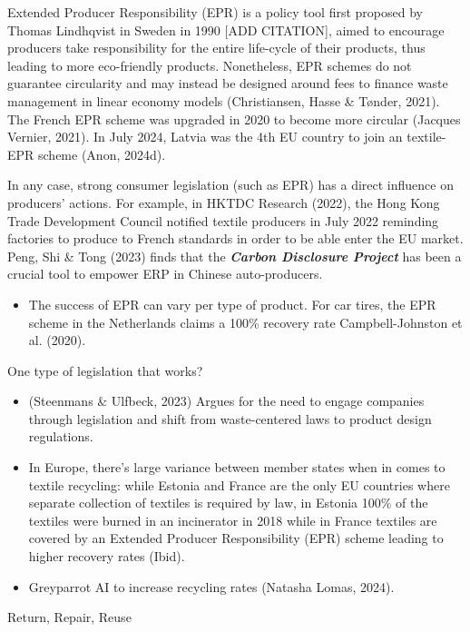 \documentclass[
  letterpaper,
  DIV=11,
  numbers=noendperiod]{scrartcl}
\providecommand{\tightlist}{%
  \setlength{\itemsep}{0pt}\setlength{\parskip}{0pt}}\usepackage{longtable,booktabs,array}
\begin{document}
Extended Producer Responsibility (EPR) is a policy tool first proposed
by Thomas Lindhqvist in Sweden in 1990 {[}ADD CITATION{]}, aimed to
encourage producers take responsibility for the entire life-cycle of
their products, thus leading to more eco-friendly products. Nonetheless,
EPR schemes do not guarantee circularity and may instead be designed
around fees to finance waste management in linear economy models
(Christiansen, Hasse \& Tønder, 2021). The French EPR scheme was
upgraded in 2020 to become more circular (Jacques Vernier, 2021). In
July 2024, Latvia was the 4th EU country to join an textile-EPR scheme
(Anon, 2024d).

In any case, strong consumer legislation (such as EPR) has a direct
influence on producers' actions. For example, in HKTDC Research (2022),
the Hong Kong Trade Development Council notified textile producers in
July 2022 reminding factories to produce to French standards in order to
be able enter the EU market. Peng, Shi \& Tong (2023) finds that the
\textbf{\emph{Carbon Disclosure Project}} has been a crucial tool to
empower ERP in Chinese auto-producers.

\begin{itemize}
\tightlist
\item
  The success of EPR can vary per type of product. For car tires, the
  EPR scheme in the Netherlands claims a 100\% recovery rate
  Campbell-Johnston et al. (2020).
\end{itemize}

One type of legislation that works?

\begin{itemize}
\item
  (Steenmans \& Ulfbeck, 2023) Argues for the need to engage companies
  through legislation and shift from waste-centered laws to product
  design regulations.
\item
  In Europe, there's large variance between member states when in comes
  to textile recycling: while Estonia and France are the only EU
  countries where separate collection of textiles is required by law, in
  Estonia 100\% of the textiles were burned in an incinerator in 2018
  while in France textiles are covered by an Extended Producer
  Responsibility (EPR) scheme leading to higher recovery rates (Ibid).
\item
  Greyparrot AI to increase recycling rates (Natasha Lomas, 2024).
\end{itemize}

Return, Repair, Reuse
\end{document}
